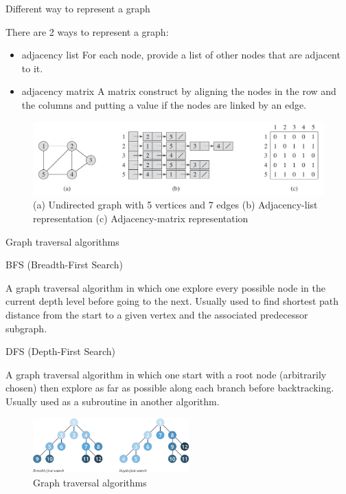 \documentclass[ignorenonframetext,]{beamer}
\providecommand{\tightlist}{%
  \setlength{\itemsep}{0pt}\setlength{\parskip}{0pt}}
\begin{document}
\begin{frame}{Different way to represent a graph}
\protect\hypertarget{different-way-to-represent-a-graph}{}

There are 2 ways to represent a graph:

\begin{itemize}
\tightlist
\item
  adjacency list For each node, provide a list of other nodes that are
  adjacent to it.
\item
  adjacency matrix A matrix construct by aligning the nodes in the row
  and the columns and putting a value if the nodes are linked by an
  edge.
\end{itemize}

\begin{figure}
\centering
\includegraphics{graph-representation.png}
\caption{(a) Undirected graph with 5 vertices and 7 edges (b)
Adjacency-list representation (c) Adjacency-matrix representation}
\end{figure}

\end{frame}

\begin{frame}{Graph traversal algorithms}
\protect\hypertarget{graph-traversal-algorithms}{}

\begin{block}{BFS (Breadth-First Search)}

A graph traversal algorithm in which one explore every possible node in
the current depth level before going to the next. Usually used to find
shortest path distance from the start to a given vertex and the
associated predecessor subgraph.

\end{block}

\begin{block}{DFS (Depth-First Search)}

A graph traversal algorithm in which one start with a root node
(arbitrarily chosen) then explore as far as possible along each branch
before backtracking. Usually used as a subroutine in another algorithm.

\begin{figure}
\centering
\includegraphics[width=\textwidth,height=0.83333in]{graph-traversal-algorithms-1.png}
\caption{Graph traversal algorithms}
\end{figure}

\end{block}

\end{frame}
\end{document}
